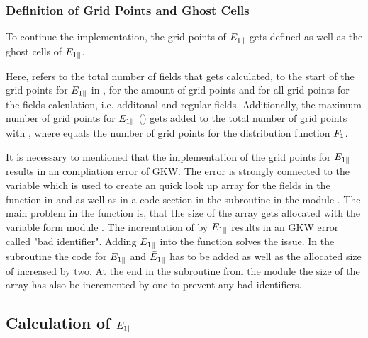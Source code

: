 \subsubsection*{Definition of Grid Points and Ghost Cells}

To continue the implementation, the grid points of $E_{1\parallel}$ gets defined as well as the ghost cells of $E_{1\parallel}$. 

Here,  refers to the total number of fields that gets calculated,  to the start of the grid points for $E_{1\parallel}$ in ,  for the amount of grid points and  for all grid points for the fields calculation, i.e. additonal and regular fields. Additionally, the maximum number of grid points for $E_{1\parallel}$ () gets added to the total number of grid points  with , where  equals the number of grid points for the distribution function $F_1$. \bigskip

It is necessary to mentioned that the implementation of the grid points for $E_{1\parallel}$ results in an compliation error of GKW. The error is strongly connected to the variable  which is used to create an quick look up array for the fields in the function  in  and  as well as in a code section in the subroutine  in the module . The main problem in the function  is, that the size of the array  gets allocated with the variable  form module . The incremtation of  by $E_{1\parallel}$ results in an GKW error called "bad identifier". Adding $E_{1\parallel}$ into the function solves the issue. In the subroutine  the code for $E_{1\parallel}$ and $\bar{E}_{1\parallel}$ has to be added as well as the allocated size of  increased by two. At the end in the subroutine  from the module  the size of the array  has also be incremented by one to prevent any bad identifiers.

\newpage

\subsection*{Calculation of $E_{1\parallel}$}

